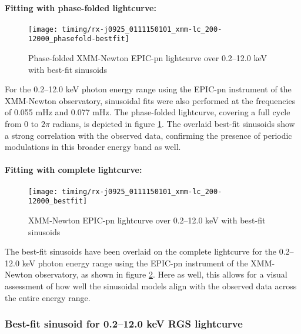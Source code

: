 				\paragraph{Fitting with phase-folded lightcurve:}
				\begin{figure}[h!]
					\centering
					\texttt{[image: timing/rx-j0925\_0111150101\_xmm-lc\_200-12000\_phasefold-bestfit]}
					\caption{Phase-folded XMM-Newton EPIC-pn lightcurve over 0.2--12.0 keV with best-fit sinusoids}
					\label{result:lc-phase-fold-mrvel-xmm:200-12000-bestfit}
				\end{figure}
				For the 0.2--12.0 keV photon energy range using the EPIC-pn instrument of the XMM-Newton observatory, sinusoidal fits were also performed at the frequencies of 0.055 mHz and 0.077 mHz. The phase-folded lightcurve, covering a full cycle from 0 to $2\pi$ radians, is depicted in figure \ref{result:lc-phase-fold-mrvel-xmm:200-12000-bestfit}. The overlaid best-fit sinusoids show a strong correlation with the observed data, confirming the presence of periodic modulations in this broader energy band as well.
				
				\paragraph{Fitting with complete lightcurve:}
				\begin{figure}[h!]
					\centering
					\texttt{[image: timing/rx-j0925\_0111150101\_xmm-lc\_200-12000\_bestfit]}
					\caption{XMM-Newton EPIC-pn lightcurve over 0.2--12.0 keV with best-fit sinusoids}
					\label{result:lc-mrvel-xmm:200-12000-bestfit}
				\end{figure}
				The best-fit sinusoids have been overlaid on the complete lightcurve for the 0.2--12.0 keV photon energy range using the EPIC-pn instrument of the XMM-Newton observatory, as shown in figure \ref{result:lc-mrvel-xmm:200-12000-bestfit}. Here as well, this allows for a visual assessment of how well the sinusoidal models align with the observed data across the entire energy range.
			
			\newpage
			\subsubsection{Best-fit sinusoid for 0.2--12.0 keV RGS lightcurve}
